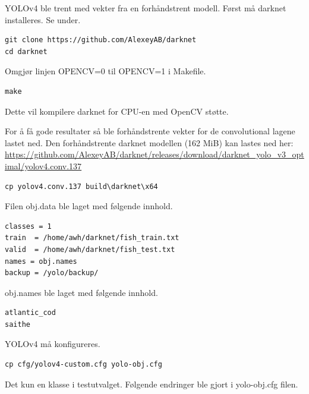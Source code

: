 YOLOv4 ble trent med vekter fra en forhåndstrent modell. Først må darknet installeres. Se under.

\begin{verbatim}
git clone https://github.com/AlexeyAB/darknet
cd darknet
\end{verbatim}

Omgjør linjen OPENCV=0 til OPENCV=1 i Makefile.

\begin{verbatim}
make
\end{verbatim}

Dette vil kompilere darknet for CPU-en med OpenCV støtte.


For å få gode resultater så ble forhåndstrente vekter for de convolutional lagene lastet ned. Den forhåndstrente darknet modellen (162 MiB) kan lastes ned her: \url{https://github.com/AlexeyAB/darknet/releases/download/darknet_yolo_v3_optimal/yolov4.conv.137}

\begin{verbatim}
cp yolov4.conv.137 build\darknet\x64
\end{verbatim}

Filen obj.data ble laget med følgende innhold.

\begin{lstlisting}[language={}, caption=obj.data]
classes = 1
train  = /home/awh/darknet/fish_train.txt
valid  = /home/awh/darknet/fish_test.txt
names = obj.names
backup = /yolo/backup/
\end{lstlisting}

obj.names ble laget med følgende innhold.

\begin{lstlisting}[language={}, caption=obj.names]
atlantic_cod
saithe
\end{lstlisting}

YOLOv4 må konfigureres.

\begin{verbatim}
cp cfg/yolov4-custom.cfg yolo-obj.cfg
\end{verbatim}

Det kun en klasse i testutvalget. Følgende endringer ble gjort i yolo-obj.cfg filen.

